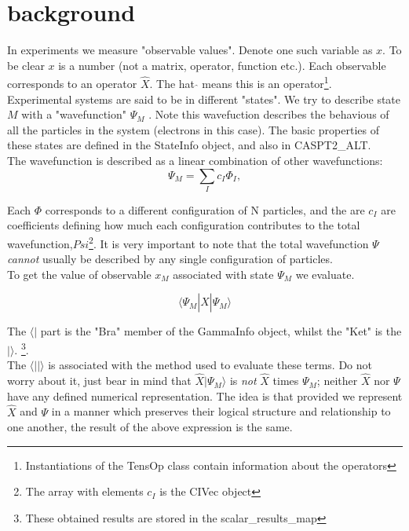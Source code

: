 \documentclass[12pt]{article}
\begin{document}
\section{background}

In experiments we measure "observable values". Denote one such variable as $x$.
To be clear $x$ is a number (not a matrix, operator, function  etc.). Each
observable corresponds to an operator $\hat{X}$. The hat $\hat{ }$ means this is
an operator\footnote{Instantiations of the TensOp class contain information
about the operators}.\\

Experimental systems are said to be in different "states". We try to describe
state $M$ with a "wavefunction" $\Psi_{M}$ . Note this wavefuction describes
the behavious of all the particles in the system (electrons in this case).  The
basic properties of these states are defined in the StateInfo object, and also
in CASPT2\_ALT. \\

The wavefunction is described as a linear combination of other wavefunctions:
\begin{equation}
\Psi_{M} = \sum_{I} c_{I}\Phi_{I},
\label {eqn:CI_wfn}
\end{equation}

Each $\Phi$ corresponds to a different configuration of N particles, and the
are $c_{I}$ are coefficients defining how much each configuration contributes to the  total
wavefunction,$Psi$\footnote{The array with elements $c_{I}$ is the CIVec
object}. It is very important to note that the total wavefunction $\Psi$
\emph{cannot} usually be described by any single configuration of particles. \\ 

To get the value of observable $x_{M}$ associated with state $\Psi_{M}$ we evaluate.

\begin{equation}
\langle \Psi_{M} | \hat{X}| \Psi_{M} \rangle
\end{equation}

The $\langle |$ part is the "Bra" member of the GammaInfo object, whilst the "Ket" is the $| \rangle$.
\footnote{These obtained results are stored in the scalar\_results\_map}.\\

The $\langle | | \rangle$ is associated with the method used to evaluate these
terms.  Do not worry about it, just bear in mind that $\hat{X} |\Psi_{M}
\rangle$ is \emph{not} $\hat{X}$ times $\Psi_{M}$; neither $\hat{X}$ nor $\Psi$ have any
defined numerical representation. The idea is that provided we represent $\hat{X}$
and $\Psi$ in a manner which preserves their logical structure and relationship
to one another, the result of the above expression is the same. \\
 
\end{document}
